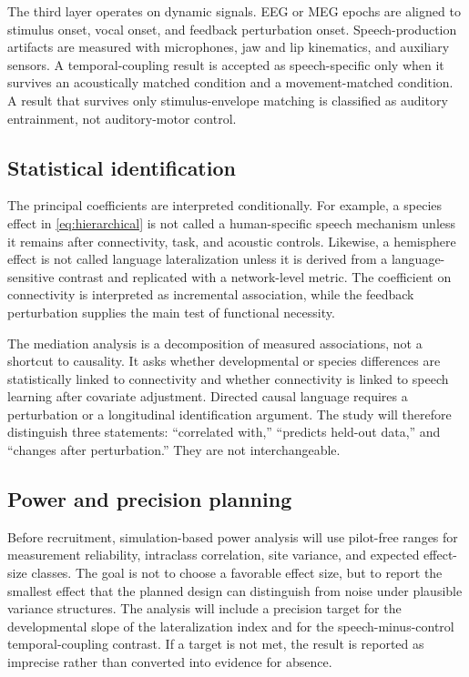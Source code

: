 \documentclass[conference]{IEEEtran}
\begin{document}
The third layer operates on dynamic signals. EEG or MEG epochs are aligned to stimulus onset, vocal onset, and feedback perturbation onset. Speech-production artifacts are measured with microphones, jaw and lip kinematics, and auxiliary sensors. A temporal-coupling result is accepted as speech-specific only when it survives an acoustically matched condition and a movement-matched condition. A result that survives only stimulus-envelope matching is classified as auditory entrainment, not auditory-motor control.

\subsection{Statistical identification}

The principal coefficients are interpreted conditionally. For example, a species effect in \eqref{eq:hierarchical} is not called a human-specific speech mechanism unless it remains after connectivity, task, and acoustic controls. Likewise, a hemisphere effect is not called language lateralization unless it is derived from a language-sensitive contrast and replicated with a network-level metric. The coefficient on connectivity is interpreted as incremental association, while the feedback perturbation supplies the main test of functional necessity.

The mediation analysis is a decomposition of measured associations, not a shortcut to causality. It asks whether developmental or species differences are statistically linked to connectivity and whether connectivity is linked to speech learning after covariate adjustment. Directed causal language requires a perturbation or a longitudinal identification argument. The study will therefore distinguish three statements: ``correlated with,'' ``predicts held-out data,'' and ``changes after perturbation.'' They are not interchangeable.

\subsection{Power and precision planning}

Before recruitment, simulation-based power analysis will use pilot-free ranges for measurement reliability, intraclass correlation, site variance, and expected effect-size classes. The goal is not to choose a favorable effect size, but to report the smallest effect that the planned design can distinguish from noise under plausible variance structures. The analysis will include a precision target for the developmental slope of the lateralization index and for the speech-minus-control temporal-coupling contrast. If a target is not met, the result is reported as imprecise rather than converted into evidence for absence.
\end{document}
